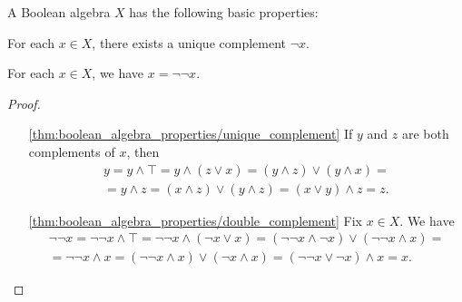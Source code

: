 \begin{proposition}\label{thm:boolean_algebra_properties}
  A Boolean algebra $X$ has the following basic properties:
  \begin{defenum}
    \item\label{thm:boolean_algebra_properties/unique_complement} For each $x \in X$, there exists a unique complement $\neg x$.
    \item\label{thm:boolean_algebra_properties/double_complement} For each $x \in X$, we have $x = \neg \neg x$.
  \end{defenum}
\end{proposition}
\begin{proof}\mbox{}
  \begin{itemize}
    \item[\ref{thm:boolean_algebra_properties/unique_complement}] If $y$ and $z$ are both complements of $x$, then
    \begin{align*}
      y
      =
      y \land \top
      =
      y \land (z \lor x)
      =
      (y \land z) \lor (y \land x)
      = \\ =
      y \land z
      =
      (x \land z) \lor (y \land z)
      =
      (x \lor y) \land z
      =
      z.
    \end{align*}

    \item[\ref{thm:boolean_algebra_properties/double_complement}] Fix $x \in X$. We have
    \begin{align*}
      \neg \neg x
      =
      \neg \neg x \land \top
      =
      \neg \neg x \land (\neg x \lor x)
      =
      (\neg \neg x \land \neg x) \lor (\neg \neg x \land x)
      = \\ =
      \neg \neg x \land x
      =
      (\neg \neg x \land x) \lor (\neg x \land x)
      =
      (\neg \neg x \lor \neg x) \land x
      =
      x.
    \end{align*}
  \end{itemize}
\end{proof}
